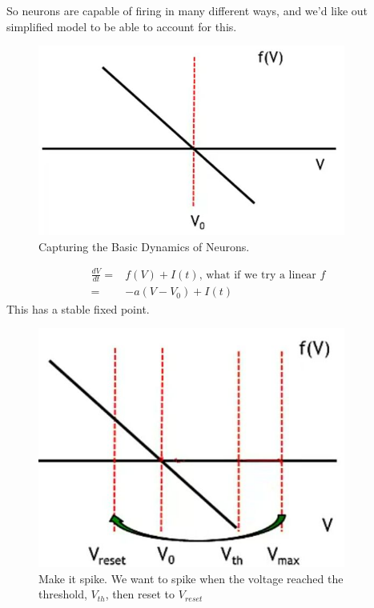 \documentclass[]{article}
\begin{document}
So neurons are capable of firing in many different ways, and we'd like out simplified model to be able to account for this.

\begin{figure}[H]
	\caption[Capturing the Basic Dynamics of Neurons]{Capturing the Basic Dynamics of Neurons.}
	\includegraphics[width=0.9\textwidth]{capturing-basic-dynamics}
\end{figure}

\begin{align*}
	\frac{dV}{dt} =& f(V) + I(t) \text{, what if we try a linear $f$}\\
	=&-a(V-V_0) + I(t)
\end{align*}
This has a stable fixed point.

\begin{figure}[H]
	\caption[Make it spike]{Make it spike. We want to spike when the voltage reached the threshold, $V_{th}$, then reset to $V_{reset}$}\label{fig:make_it_spike}
	\includegraphics[width=0.9\textwidth]{make-it-spike}
\end{figure}
\end{document}
